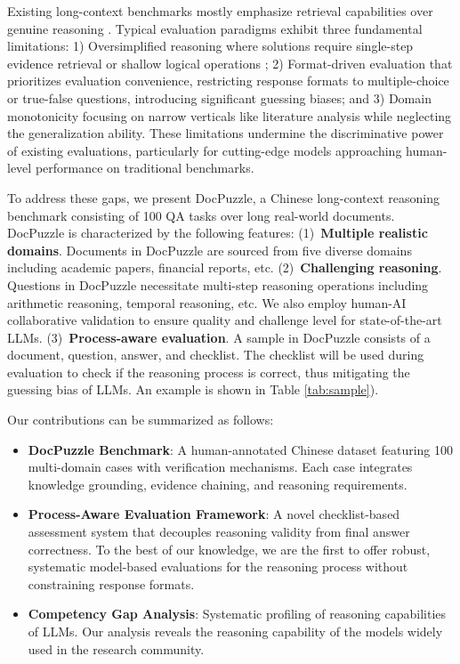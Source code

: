 Existing long-context benchmarks mostly emphasize retrieval capabilities over genuine reasoning \cite{BAMBOO, RULER}. 
Typical evaluation paradigms exhibit three fundamental limitations: 1) Oversimplified reasoning where solutions require single-step evidence retrieval \cite{Vodrahalli2024MichelangeloLC, DOCBENCH} or shallow logical operations \cite{Vodrahalli2024MichelangeloLC, DOCBENCH, INFINITEBENCH, HELMET, DocFinQA}; 
2) Format-driven evaluation that prioritizes evaluation convenience, restricting response formats to multiple-choice or true-false questions, introducing significant guessing biases\cite{LongBench2, NoCha}; 
and 3) Domain monotonicity focusing on narrow verticals like literature analysis \cite{NoCha, DetectiveQA} while neglecting the generalization ability. 
These limitations undermine the discriminative power of existing evaluations, particularly for cutting-edge models approaching human-level performance on traditional benchmarks.



To address these gaps, we present DocPuzzle, a Chinese long-context reasoning benchmark consisting of 100 QA tasks over long real-world documents.
DocPuzzle is characterized by the following features: 
(1)~\textbf{Multiple realistic domains}. Documents in DocPuzzle are sourced from five diverse domains including academic papers, financial reports, etc. 
(2)~\textbf{Challenging reasoning}. Questions in DocPuzzle necessitate multi-step reasoning operations including arithmetic reasoning, temporal reasoning, etc. We also employ human-AI collaborative validation to ensure quality and challenge level for state-of-the-art LLMs.
(3)~\textbf{Process-aware evaluation}. A sample in DocPuzzle consists of a document, question, answer, and checklist. The checklist will be used during evaluation to check if the reasoning process is correct, thus mitigating the guessing bias of LLMs. An example is shown in Table \ref{tab:sample}).






Our contributions can be summarized as follows:
\begin{itemize}
    \item  \textbf{DocPuzzle Benchmark}:  A human-annotated Chinese dataset featuring 100 multi-domain cases with verification mechanisms. 
    Each case integrates knowledge grounding, evidence chaining, and reasoning requirements.
    \item \textbf{Process-Aware Evaluation Framework}: A novel checklist-based assessment system that decouples reasoning validity from final answer correctness. 
    To the best of our knowledge, we are the first to offer robust, systematic model-based evaluations for the reasoning process without constraining response formats.
    \item \textbf{Competency Gap Analysis}: Systematic profiling of reasoning capabilities of LLMs.
    Our analysis reveals the reasoning capability of the models widely used in the research community.
\end{itemize}


